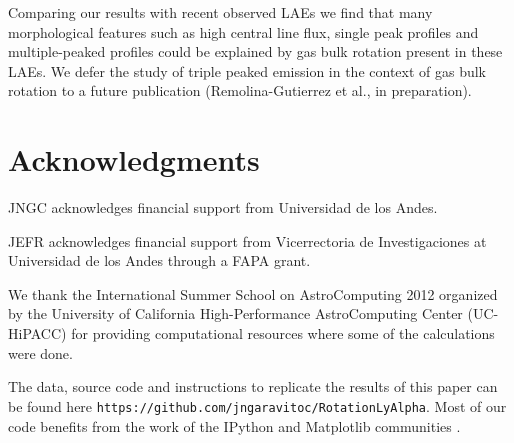\documentclass{emulateapj}
\begin{document}
Comparing our results with recent observed LAEs we find that many 
morphological features such as high central line flux, single peak
profiles and multiple-peaked profiles could be explained by gas bulk 
rotation present in these LAEs. We defer the study of triple peaked
emission in the context of gas bulk rotation to a future publication
(Remolina-Gutierrez et al., in preparation).


\section*{Acknowledgments}

JNGC acknowledges financial support from Universidad de los
Andes. 

JEFR acknowledges financial support from Vicerrectoria de
Investigaciones at Universidad de los Andes through a FAPA grant.

We thank the International Summer School on AstroComputing
2012 organized by the University of California High-Performance
AstroComputing Center (UC-HiPACC) for providing computational
resources where some of the calculations were done. 

The data, source code and instructions to
replicate the results of this paper can be found
here {\texttt{https://github.com/jngaravitoc/RotationLyAlpha}}.
Most of our code benefits from the work of the IPython and Matplotlib
communities \citep{IPython,matplotlib}.





 
\end{document}
